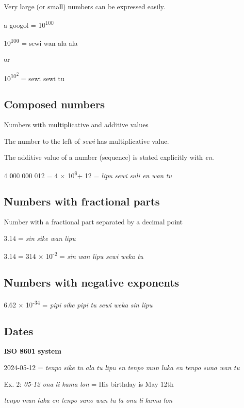 \documentclass{article}
\begin{document}
    Very large (or small) numbers can be expressed easily.
    
    \vspace {6 pt}
	
	a googol = 10\textsuperscript{100}
	
    \vspace {6 pt}
	
	10\textsuperscript{100} = sewi wan ala ala
	
	or
	
	10\textsuperscript{10\textsuperscript{2}} = sewi sewi tu
	
	\subsection{Composed numbers}
	
	Numbers with multiplicative and additive values
	
	The number to the left of \emph{sewi} has multiplicative value.
	
	The additive value of a number (sequence) is stated explicitly with
	\emph{en}.
   \vspace {6 pt}
   	
	4 000 000 012 = 4 × 10\textsuperscript{9}+ 12 = \emph{lipu sewi suli en
		wan tu}
	
	\subsection{Numbers with fractional parts}
	
	Number with a fractional part separated by a decimal point
	
	3.14 = \emph{sin sike wan lipu}
	
	3.14 = 314 × 10\textsuperscript{-2} = \emph{sin wan lipu sewi weka tu}
	
	\subsection{Numbers with negative exponents}
	
	6.62 × 10\textsuperscript{-34} = \emph{pipi sike pipi tu sewi weka sin
		lipu}
	
	\subsection{Dates}
	
	\textbf{ISO 8601 system}
	\vspace{5pt}
	
	2024-05-12 = \emph{tenpo sike tu ala tu lipu en tenpo mun luka en tenpo
		suno wan tu}
	
	Ex. 2: \emph{05-12 ona li kama lon} = His birthday is May 12th
	
	\emph{tenpo mun luka en tenpo suno wan tu la ona li kama lon}

	
\end{document}
